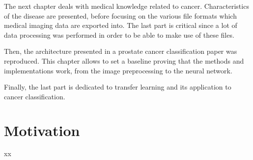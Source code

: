 The next chapter deals with medical knowledge related to cancer. Characteristics of the disease are presented, before focusing on the various file formats which medical imaging data are exported into. The last part is critical since a lot of data processing was performed in order to be able to make use of these files.

Then, the architecture presented in a prostate cancer classification paper was reproduced. This chapter allows to set a baseline proving that the methods and implementations work, from the image preprocessing to the neural network.

Finally, the last part is dedicated to transfer learning and its application to cancer classification.



\section{Motivation}
xx


